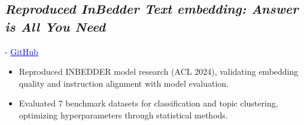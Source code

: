 \subsection{\sl {\bfseries Reproduced InBedder Text embedding: Answer is All You Need}}   -
\href{https://github.com/Hjhirp/InBedder?tab=readme-ov-file}{\textcolor{blue}{\underline{GitHub }}}
\begin{itemize}
\item Reproduced INBEDDER model research (ACL 2024), validating embedding quality and instruction alignment with model evaluation.
\item Evaluated 7 benchmark datasets for classification and topic clustering, optimizing hyperparameters through statistical methods.
\end{itemize}




    
